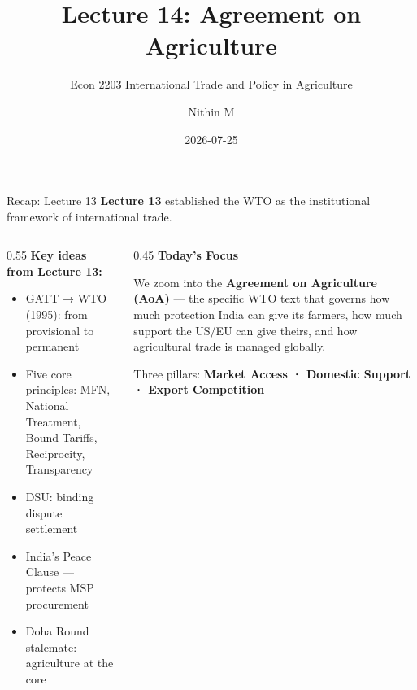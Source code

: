 \documentclass[
  ignorenonframetext,
  aspectratio=169,
]{beamer}
\title[L14 \textbar{} Agreement on Agriculture]{Lecture 14: Agreement on
Agriculture}
\subtitle{Econ 2203 \textbar{} International Trade and Policy in
Agriculture}
\author{Nithin M}
\date{2026-07-25}
\institute{Department of Development Economics}
\makeatletter
\providecommand{\tightlist}{%
  \setlength{\itemsep}{0pt}\setlength{\parskip}{0pt}}
\let\quarto@originallabel\label
\DeclareRobustCommand*{\label}[1]{\quarto@originallabel{#1}}
\makeatother
\begin{document}
\frame{\titlepage}


\begin{frame}{Recap: Lecture 13}
\label{recap-lecture-13}
\textbf{Lecture 13} established the WTO as the institutional framework
of international trade.

\begin{columns}[T]
\begin{column}{0.55\linewidth}
\textbf{Key ideas from Lecture 13:}

\begin{itemize}
\tightlist
\item
  GATT → WTO (1995): from provisional to permanent
\item
  Five core principles: MFN, National Treatment, Bound Tariffs,
  Reciprocity, Transparency
\item
  DSU: binding dispute settlement
\item
  India's Peace Clause --- protects MSP procurement
\item
  Doha Round stalemate: agriculture at the core
\end{itemize}
\end{column}

\begin{column}{0.45\linewidth}
\textbf{Today's Focus}

We zoom into the \textbf{Agreement on Agriculture (AoA)} --- the
specific WTO text that governs how much protection India can give its
farmers, how much support the US/EU can give theirs, and how
agricultural trade is managed globally.

Three pillars: \textbf{Market Access · Domestic Support · Export
Competition}
\end{column}
\end{columns}
\end{frame}
\end{document}
